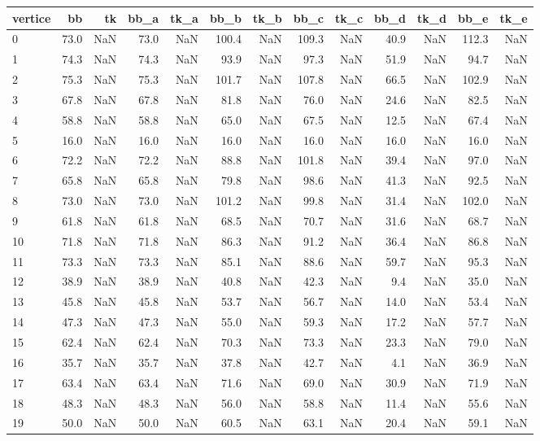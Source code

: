 \begin{tabular}{lrrrrrrrrrrrr}
\toprule
vertice & bb & tk & bb_a & tk_a & bb_b & tk_b & bb_c & tk_c & bb_d & tk_d & bb_e & tk_e \\
\midrule
0 & 73.0 & NaN & 73.0 & NaN & 100.4 & NaN & 109.3 & NaN & 40.9 & NaN & 112.3 & NaN \\
1 & 74.3 & NaN & 74.3 & NaN & 93.9 & NaN & 97.3 & NaN & 51.9 & NaN & 94.7 & NaN \\
2 & 75.3 & NaN & 75.3 & NaN & 101.7 & NaN & 107.8 & NaN & 66.5 & NaN & 102.9 & NaN \\
3 & 67.8 & NaN & 67.8 & NaN & 81.8 & NaN & 76.0 & NaN & 24.6 & NaN & 82.5 & NaN \\
4 & 58.8 & NaN & 58.8 & NaN & 65.0 & NaN & 67.5 & NaN & 12.5 & NaN & 67.4 & NaN \\
5 & 16.0 & NaN & 16.0 & NaN & 16.0 & NaN & 16.0 & NaN & 16.0 & NaN & 16.0 & NaN \\
6 & 72.2 & NaN & 72.2 & NaN & 88.8 & NaN & 101.8 & NaN & 39.4 & NaN & 97.0 & NaN \\
7 & 65.8 & NaN & 65.8 & NaN & 79.8 & NaN & 98.6 & NaN & 41.3 & NaN & 92.5 & NaN \\
8 & 73.0 & NaN & 73.0 & NaN & 101.2 & NaN & 99.8 & NaN & 31.4 & NaN & 102.0 & NaN \\
9 & 61.8 & NaN & 61.8 & NaN & 68.5 & NaN & 70.7 & NaN & 31.6 & NaN & 68.7 & NaN \\
10 & 71.8 & NaN & 71.8 & NaN & 86.3 & NaN & 91.2 & NaN & 36.4 & NaN & 86.8 & NaN \\
11 & 73.3 & NaN & 73.3 & NaN & 85.1 & NaN & 88.6 & NaN & 59.7 & NaN & 95.3 & NaN \\
12 & 38.9 & NaN & 38.9 & NaN & 40.8 & NaN & 42.3 & NaN & 9.4 & NaN & 35.0 & NaN \\
13 & 45.8 & NaN & 45.8 & NaN & 53.7 & NaN & 56.7 & NaN & 14.0 & NaN & 53.4 & NaN \\
14 & 47.3 & NaN & 47.3 & NaN & 55.0 & NaN & 59.3 & NaN & 17.2 & NaN & 57.7 & NaN \\
15 & 62.4 & NaN & 62.4 & NaN & 70.3 & NaN & 73.3 & NaN & 23.3 & NaN & 79.0 & NaN \\
16 & 35.7 & NaN & 35.7 & NaN & 37.8 & NaN & 42.7 & NaN & 4.1 & NaN & 36.9 & NaN \\
17 & 63.4 & NaN & 63.4 & NaN & 71.6 & NaN & 69.0 & NaN & 30.9 & NaN & 71.9 & NaN \\
18 & 48.3 & NaN & 48.3 & NaN & 56.0 & NaN & 58.8 & NaN & 11.4 & NaN & 55.6 & NaN \\
19 & 50.0 & NaN & 50.0 & NaN & 60.5 & NaN & 63.1 & NaN & 20.4 & NaN & 59.1 & NaN \\

\end{tabular}
